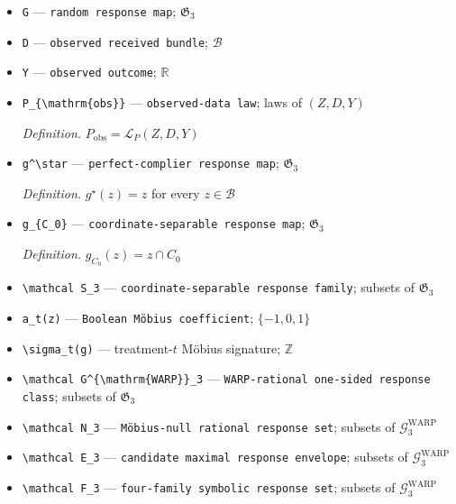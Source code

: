 \documentclass{article}
\begin{document}
\begin{itemize}
  \item \texttt{G} --- \texttt{random response map}; \(\mathfrak G_3\)
  \item \texttt{D} --- \texttt{observed received bundle}; \(\mathcal B\)
  \item \texttt{Y} --- \texttt{observed outcome}; \(\mathbb R\)
  \item \texttt{P\_\allowbreak{}\{\textbackslash{}\allowbreak{}mathrm\{obs\}\allowbreak{}\}\allowbreak{}} --- \texttt{observed-\allowbreak{}data law}; laws of \((Z,D,Y)\)
  \par\smallskip\noindent\emph{Definition.} \(P_{\mathrm{obs}}=\mathcal L_P(Z,D,Y)\)
  \item \texttt{g\textasciicircum{}\textbackslash{}\allowbreak{}star} --- \texttt{perfect-\allowbreak{}complier response map}; \(\mathfrak G_3\)
  \par\smallskip\noindent\emph{Definition.} \(g^\star(z)=z\) for every \(z\in\mathcal B\)
  \item \texttt{g\_\allowbreak{}\{C\_\allowbreak{}0\}\allowbreak{}} --- \texttt{coordinate-\allowbreak{}separable response map}; \(\mathfrak G_3\)
  \par\smallskip\noindent\emph{Definition.} \(g_{C_0}(z)=z\cap C_0\)
  \item \texttt{\textbackslash{}\allowbreak{}mathcal S\_\allowbreak{}3} --- \texttt{coordinate-\allowbreak{}separable response family}; subsets of \(\mathfrak G_3\)
  \item \texttt{a\_\allowbreak{}t(z)} --- \texttt{Boolean Möbius coefficient}; \(\{-1,0,1\}\)
  \item \texttt{\textbackslash{}\allowbreak{}sigma\_\allowbreak{}t(g)} --- treatment-\(t\) Möbius signature; \(\mathbb Z\)
  \item \texttt{\textbackslash{}\allowbreak{}mathcal G\textasciicircum{}\{\textbackslash{}\allowbreak{}mathrm\{WARP\}\allowbreak{}\}\allowbreak{}\_\allowbreak{}3} --- \texttt{WARP-\allowbreak{}rational one-\allowbreak{}sided response class}; subsets of \(\mathfrak G_3\)
  \item \texttt{\textbackslash{}\allowbreak{}mathcal N\_\allowbreak{}3} --- \texttt{Möbius-\allowbreak{}null rational response set}; subsets of \(\mathcal G^{\mathrm{WARP}}_3\)
  \item \texttt{\textbackslash{}\allowbreak{}mathcal E\_\allowbreak{}3} --- \texttt{candidate maximal response envelope}; subsets of \(\mathcal G^{\mathrm{WARP}}_3\)
  \item \texttt{\textbackslash{}\allowbreak{}mathcal F\_\allowbreak{}3} --- \texttt{four-\allowbreak{}family symbolic response set}; subsets of \(\mathcal G^{\mathrm{WARP}}_3\)

\end{itemize}
\end{document}
